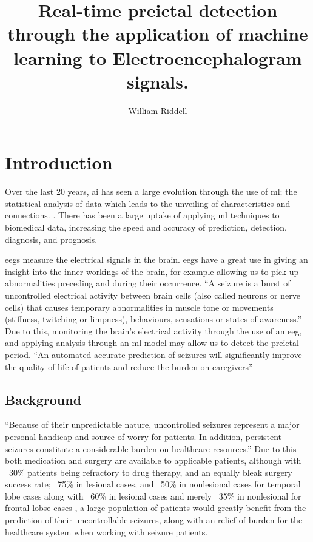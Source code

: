\documentclass[12pt]{article}
\title{Real-time preictal detection through the application of machine learning to Electroencephalogram signals.}
\author{William Riddell}
\date{\parbox{\linewidth}{\centering%
\vspace{0.5cm}\today\endgraf\bigskip\vspace{0.5cm}
  Word Count: 10,000 }}
\begin{document}
\maketitle
\pagebreak
\tableofcontents
\pagebreak

\printglossary[type=\acronymtype]


\section{Introduction}

Over the last 20 years, \acrfull{ai} has seen a large evolution through the use of \acrfull{ml}; the statistical analysis of data which leads to the unveiling of characteristics and connections. \cite{awad2015efficient}. There has been a large uptake of applying \acrshort{ml} techniques to biomedical data, increasing the speed and accuracy of prediction, detection, diagnosis, and prognosis. 

\acrfull{eegs} measure the electrical signals in the brain. \acrshort{eegs} have a great use in giving an insight into the inner workings of the brain, for example allowing us to pick up abnormalities preceding and during their occurrence. ``A seizure is a burst of uncontrolled electrical activity between brain cells (also called neurons or nerve cells) that causes temporary abnormalities in muscle tone or movements (stiffness, twitching or limpness), behaviours, sensations or states of awareness.'' \cite{johnHopkinsTypesOfSeizures} Due to this, monitoring the brain's electrical activity through the use of an \acrshort{eeg}, and applying analysis through an \acrshort{ml} model may allow us to detect the preictal period. ``An automated accurate prediction of seizures will significantly improve the quality of life of patients and reduce the burden on caregivers'' \cite{acharya2018automated}



\subsection{Background}

``Because of their unpredictable nature, uncontrolled seizures represent a major personal handicap and source of worry for patients. In addition, persistent seizures constitute a considerable burden on healthcare resources.'' \cite{assi2017towards} Due to this both medication and surgery are available to applicable patients, although with ~30\% patients being refractory to drug therapy, and an equally bleak surgery success rate; ~75\% in lesional cases, and ~50\% in nonlesional cases for temporal lobe cases along with ~60\% in lesional cases and merely ~35\% in nonlesional for frontal lobse cases \cite{assi2017towards}, a large population of patients would greatly benefit from the prediction of their uncontrollable seizures, along with an relief of burden for the healthcare system when working with seizure patients. 
\end{document}

